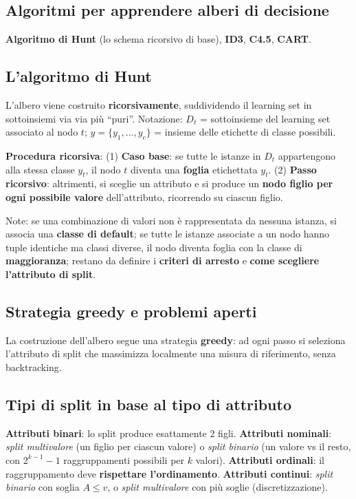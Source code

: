 \documentclass[11pt,a4paper]{report}
\begin{document}
\subsection*{Algoritmi per apprendere alberi di decisione}

\textbf{Algoritmo di Hunt} (lo schema ricorsivo di base), \textbf{ID3}, \textbf{C4.5}, \textbf{CART}.

\subsection*{L'algoritmo di Hunt}

L'albero viene costruito \textbf{ricorsivamente}, suddividendo il learning set in sottoinsiemi via via più ``puri''. Notazione: $D_t$ = sottoinsieme del learning set associato al nodo $t$; $y=\{y_1,\dots,y_c\}$ = insieme delle etichette di classe possibili.

\textbf{Procedura ricorsiva}: (1) \textbf{Caso base}: se tutte le istanze in $D_t$ appartengono alla stessa classe $y_t$, il nodo $t$ diventa una \textbf{foglia} etichettata $y_t$. (2) \textbf{Passo ricorsivo}: altrimenti, si sceglie un attributo e si produce un \textbf{nodo figlio per ogni possibile valore} dell'attributo, ricorrendo su ciascun figlio.

Note: se una combinazione di valori non è rappresentata da nessuna istanza, si associa una \textbf{classe di default}; se tutte le istanze associate a un nodo hanno tuple identiche ma classi diverse, il nodo diventa foglia con la classe di \textbf{maggioranza}; restano da definire i \textbf{criteri di arresto} e \textbf{come scegliere l'attributo di split}.

\subsection*{Strategia greedy e problemi aperti}

La costruzione dell'albero segue una strategia \textbf{greedy}: ad ogni passo si seleziona l'attributo di split che massimizza localmente una misura di riferimento, senza backtracking.

\subsection*{Tipi di split in base al tipo di attributo}

\textbf{Attributi binari}: lo split produce esattamente 2 figli. \textbf{Attributi nominali}: \emph{split multivalore} (un figlio per ciascun valore) o \emph{split binario} (un valore vs il resto, con $2^{k-1}-1$ raggruppamenti possibili per $k$ valori). \textbf{Attributi ordinali}: il raggruppamento deve \textbf{rispettare l'ordinamento}. \textbf{Attributi continui}: \emph{split binario} con soglia $A \le v$, o \emph{split multivalore} con più soglie (discretizzazione).
\end{document}
